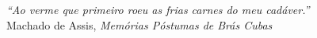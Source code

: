 \begin{dedicatoria}
   \vspace*{\fill}
   \centering
   \noindent
   \textit{``Ao verme que primeiro roeu as frias carnes do meu cadáver.''}\\[0.5em]
   Machado de Assis, \textit{Memórias Póstumas de Brás Cubas}
   \vspace*{\fill}
\end{dedicatoria}
